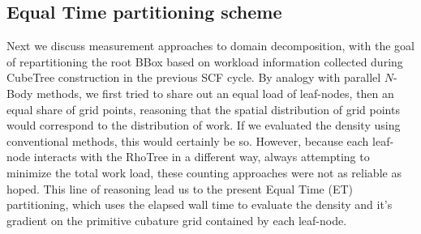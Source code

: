 \commentoutA{\documentclass[prb,aps,twocolumn,twocolumngrid]{revtex4}}
\begin{document}
\subsection{Equal Time partitioning scheme}
\label{subsec:Equal Time}

Next we discuss measurement approaches to domain decomposition, with
the goal of repartitioning the root BBox based on workload information
collected during CubeTree construction in the previous SCF cycle.  By
analogy with parallel $N$-Body
methods\cite{JPilkington96,warren:92_article,Grama94_article,Warren95b,Singh93,Singh_95v27,Grama_98v24},
we first tried to share out an equal load of leaf-nodes, then an equal
share of grid points, reasoning that the spatial distribution of grid
points would correspond to the distribution of work.  If we evaluated
the density using conventional methods, this would certainly be so.
However, because each leaf-node interacts with the RhoTree in a
different way, always attempting to minimize the total work load,
these counting approaches were not as reliable as hoped.  This line of
reasoning lead us to the present Equal Time (ET) partitioning, which
uses the elapsed wall time to evaluate the density and it's gradient
on the primitive cubature grid contained by each leaf-node.
\end{document}
